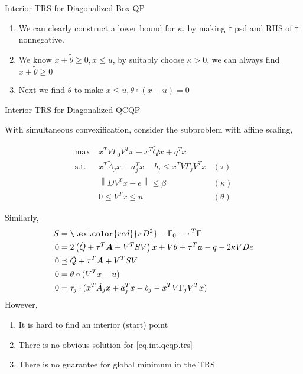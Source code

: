 \documentclass{beamerswitch}
\newcommand{\st}{\mathrm{s.t.\;}}
\newcommand{\red}[1]{\textcolor{red}{#1}}
\begin{document}
\begin{frame}[allowframebreaks]{Interior TRS for Diagonalized Box-QP}
  \begin{enumerate}
    \item We can clearly construct a lower bound for \(\kappa\), by making \(\dagger\) psd and RHS of \(\ddagger\) nonnegative.
    \item We know \(x + \tilde \theta \ge 0, x\le u \), by suitably choose \(\kappa > 0\), we can always find \(x + \tilde \theta \ge 0\)
    \item Next we find \(\tilde \theta \) to make \(x \le u, \theta \circ (x - u) = 0\)
  \end{enumerate}
\end{frame}

\begin{frame}[allowframebreaks]{Interior TRS for Diagonalized QCQP}

  With simultaneous convexification, consider the subproblem with affine scaling,

  \begin{equation}\label{eq.int.qcqp}
    \begin{aligned}
      \max ~ & x^TV\Gamma_0V^T x - x^T\tilde Q x + q^Tx                         \\
      \st  ~ & x^T\tilde A_j x + a_j ^Tx - b_j \le x^TV\Gamma_j V^Tx & (\tau)   \\
             & \left \|DV^Tx - e  \right \|  \le \beta               & (\kappa) \\
             & 0 \le V^Tx \le u                                      & (\theta)
    \end{aligned}
  \end{equation}

  Similarly,
  \begin{equation}\label{eq.int.qcqp.trs}
    \begin{aligned}
      S & = \red{\kappa D^2} - \Gamma_0 - \tau^T \bm  \Gamma                                          \\
      0 & = 2\left(\tilde Q + \tau^T \bm A + V^TSV\right) x + V\theta + \tau^T\bm a - q - 2\kappa VDe \\
      0 & \preceq  \tilde Q + \tau^T \bm A + V^TSV                                                    \\
      0 & = \theta \circ (V^Tx-u)                                                                     \\
      0 & = \tau_j \cdot (x^T\tilde A_j x + a_j ^Tx - b_j - x^TV\Gamma_j V^Tx)
    \end{aligned}
  \end{equation}
  However,

  \begin{enumerate}
    \item It is hard to find an interior (start) point
    \item There is no obvious solution for \eqref{eq.int.qcqp.trs}
    \item There is no guarantee for global minimum in the TRS
  \end{enumerate}
\end{frame}
\end{document}
